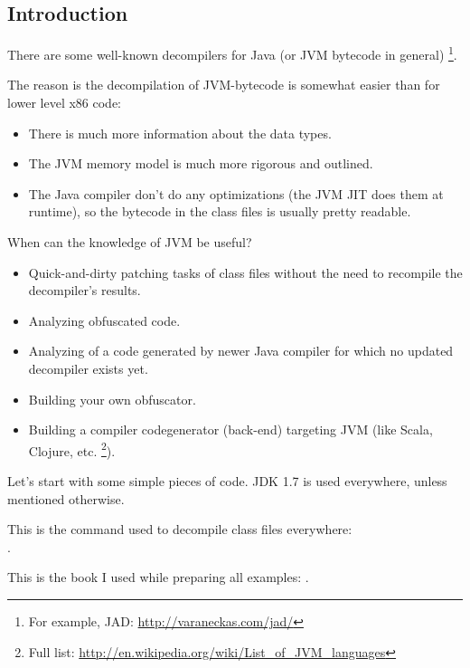 \subsection{Introduction}

\newcommand{\JADURL}{\url{http://varaneckas.com/jad/}}

There are some well-known decompilers for Java (or \ac{JVM} bytecode in general)
\footnote{For example, JAD: \JADURL}.

The reason is the decompilation of \ac{JVM}-bytecode is somewhat easier 
than for lower level x86 code:

\begin{itemize}
\item There is much more information about the data types.
\item The \ac{JVM} memory model is much more rigorous and outlined.
\item The Java compiler don't do any optimizations (the \ac{JVM} \ac{JIT} does them at runtime),
      so the bytecode in the class files is usually pretty readable.
      
\end{itemize}

When can the knowledge of \ac{JVM} be useful?

\newcommand{\URLListOfJVMLangs}{\url{http://en.wikipedia.org/wiki/List_of_JVM_languages}}

\begin{itemize}
\item Quick-and-dirty patching tasks of class files without the need to recompile the decompiler's results.
\item Analyzing obfuscated code.
\item Analyzing of a code generated by newer Java compiler for which no updated decompiler exists yet.
\item Building your own obfuscator.
\item Building a compiler codegenerator (back-end) targeting \ac{JVM} (like Scala, Clojure, etc.
      \footnote{Full list: \URLListOfJVMLangs}).
      
\end{itemize}

Let's start with some simple pieces of code.
JDK 1.7 is used everywhere, unless mentioned otherwise.

This is the command used to decompile class files everywhere:\\
.

This is the book I used while preparing all examples: \JavaBook.

